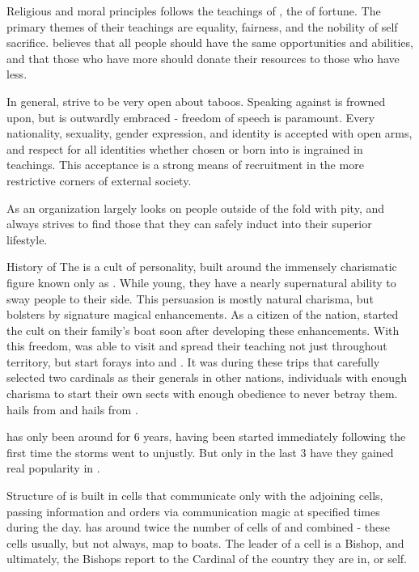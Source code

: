 \documentclass[blue]{GL2020}
\begin{document}
\name{\bCult{}}

Religious and moral principles
\pCult{} follows the teachings of \cCultGod, the \cCultGod{\god} of fortune. The primary themes of their teachings are equality, fairness, and the nobility of self sacrifice. \pCult believes that all people should have the same opportunities and abilities, and that those who have more should donate their resources to those who have less. 

In general, \pCult strive to be very open about taboos. Speaking against \pCult is frowned upon, but is outwardly embraced - freedom of speech is paramount. Every nationality, sexuality, gender expression, and identity is accepted with open arms, and respect for all identities whether chosen or born into is ingrained in \pCult teachings. This acceptance is a strong means of recruitment in the more restrictive corners of external society.

As an organization \pCult largely looks on people outside of the fold with pity, and always strives to find those that they can safely induct into their superior lifestyle.

History of \pCult
The \pCult is a cult of personality, built around the immensely charismatic figure known only as \cCultLeader. While young, they have a nearly supernatural ability to sway people to their side. This persuasion is mostly natural charisma, but bolsters by signature magical enhancements. As a citizen of the \pViking nation, \cCultLeader started the cult on their family's boat soon after developing these enhancements. With this freedom, \cCultLeader{\they} was able to visit and spread their teaching not just throughout \pViking territory, but start forays into \pTech and \pFarm. It was during these trips that \cCultLeader carefully selected two cardinals as their generals in other nations, individuals with enough charisma to start their own sects with enough obedience to never betray them. \cTechCardinal hails from \pTech and \cFarmCardinal hails from \pFarm.

\pCult has only been around for 6 years, having been started immediately following the first time the storms went to \pViking unjustly. But only in the last 3 have they gained real popularity in \pViking.

Structure of \cCult
\cCult is built in cells that communicate only with the adjoining cells, passing information and orders via communication magic at specified times during the day. \pViking has around twice the number of cells of \pTech and \pFarm combined - these cells usually, but not always, map to boats. The leader of a cell is a Bishop, and ultimately, the Bishops report to the Cardinal of the country they are in, or \cCultLeader \cCultLeader{\them}self.
\end{document}
